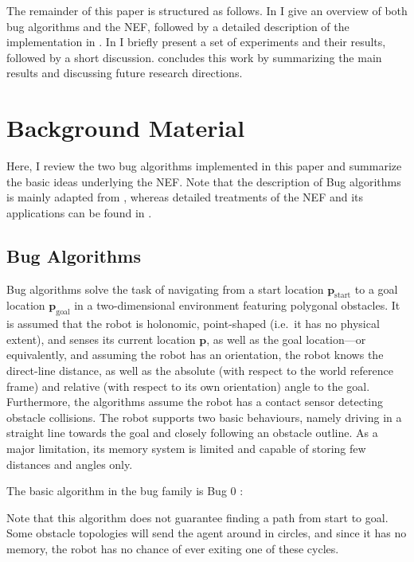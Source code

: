 \documentclass[letterpaper,10pt,conference]{ieeeconf}
\renewcommand{\vec}[1]{\bm{#1}}
\begin{document}
The remainder of this paper is structured as follows. In  I give an overview of both bug algorithms and the NEF, followed by a detailed description of the implementation in . In  I briefly present a set of experiments and their results, followed by a short discussion.  concludes this work by summarizing the main results and discussing future research directions.

\section{Background Material}
\label{sec:background}

Here, I review the two bug algorithms implemented in this paper and summarize the basic ideas underlying the NEF. Note that the description of Bug algorithms is mainly adapted from \cite{lumelsky1987path,lavalle2006planning,bullo2016lectures}, whereas detailed treatments of the NEF and its applications can be found in \cite{eliasmith2003neural,eliasmith2012large,stewart2012neural,eliasmith2013build}.

\subsection{Bug Algorithms}
\label{sec:bug_algorithms}

Bug algorithms solve the task of navigating from a start location $\vec p_\mathrm{start}$ to a goal location $\vec p_\mathrm{goal}$ in a two-dimensional environment featuring polygonal obstacles. It is assumed that the robot is holonomic, point-shaped (i.e.~it has no physical extent), and senses its current location $\vec p$, as well as the goal location---or equivalently, and assuming the robot has an orientation, the robot knows the direct-line distance, as well as the absolute (with respect to the world reference frame) and relative (with respect to its own orientation) angle to the goal. Furthermore, the algorithms assume the robot has a contact sensor detecting obstacle collisions. The robot supports two basic behaviours, namely driving in a straight line towards the goal and closely following an obstacle outline. As a major limitation, its memory system is limited and capable of storing few distances and angles only.

The basic algorithm in the bug family is Bug 0 \cite{bullo2016lectures}:
\begin{algorithmic}[1]
	\EndWhile
	\EndIf
	\EndWhile
\end{algorithmic}
Note that this algorithm does not guarantee finding a path from start to goal. Some obstacle topologies will send the agent around in circles, and since it has no memory, the robot has no chance of ever exiting one of these cycles.
\end{document}
